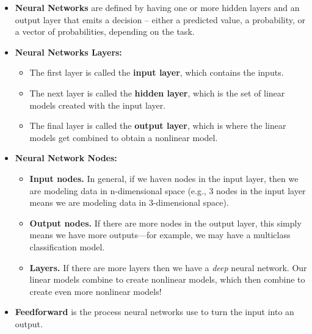 \begin{itemize}
    \item \textbf{Neural Networks} are defined by having one or more hidden layers and an output layer that emits a decision -- either a predicted value, a probability, or a vector of probabilities, depending on the task.
    \item \textbf{Neural Networks Layers:}

\begin{itemize}
        \item The first layer is called the \textbf{input layer}, which contains the inputs.
        \item The next layer is called the \textbf{hidden layer}, which is the set of linear models created with the input layer.
        \item The final layer is called the \textbf{output layer}, which is where the linear models get combined to obtain a nonlinear model.
\end{itemize}

    \item \textbf{Neural Network Nodes:}

\begin{itemize}
        \item \textbf{Input nodes.} In general, if we have\textit{n} nodes in the input layer, then we are modeling data in n-dimensional space (e.g., 3 nodes in the input layer means we are modeling data in 3-dimensional space).
        \item \textbf{Output nodes.} If there are more nodes in the output layer, this simply means we have more outputs—for example, we may have a multiclass classification model.
        \item \textbf{Layers.} If there are more layers then we have a \textit{deep} neural network. Our linear models combine to create nonlinear models, which then combine to create even more nonlinear models!
\end{itemize}

    \item \textbf{Feedforward} is the process neural networks use to turn the input into an output.
\end{itemize}
